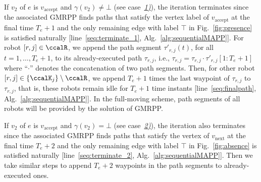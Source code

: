 \documentclass[Afour,sageh,times]{sagej}
\begin{document}
{{  If $v_2$ of $e$ is $v_{\text{accept}}$ and $\gamma(v_2) \neq \bot$ (see case~\hyperref[sec:gmmpp1]{\it 1)}), the iteration terminates since the associated GMRPP finds paths that satisfy the vertex label of $v_{\text{accept}}$ at the final time $T_e + 1$ and the only remaining edge with label $\top$ in Fig.~\ref{fig:presence} is satisfied naturally [line~\ref{seq:terminate_1}, Alg.~\ref{alg:sequentialMAPP}]. For robot $[r, j] \in \ccalR$, we append the path segment $\tau'_{r,j}(t)$, for all $t = 1, \ldots, T_e+1$, to its already-executed path $\tau_{r,j}$, i.e.,  $\tau_{r,j} = \tau_{r,j} \cdot \tau'_{r,j}[1:T_e+1]$ where ``$\cdot$'' denotes the concatenation of two path segments. Then, for other robot $[r,j] \in \{\ccalK_j\}\setminus \ccalR$, we  append  $T_e+1$ times  the last waypoint of  $\tau_{r,j}$  to $\tau_{r,j}$, that is, these robots  remain idle for $T_e+1$ time instants [line~\ref{seq:finalpath}, Alg.~\ref{alg:sequentialMAPP}]. In the full-moving scheme, path segments of all robots will be provided by the solution of GMRPP.

  If $v_2$ of $e$ is $v_{\text{accept}}$ and $\gamma(v_2) = \bot$ (see case~\hyperref[sec:gmmpp2]{\it 2)}), the iteration also terminates since the associated GMRPP finds paths that satisfy the vertex of $v_{\text{next}}$ at the final time $T_e + 2$ and the only remaining edge with label $\top$ in Fig.~\ref{fig:absence} is satisfied naturally [line~\ref{seq:terminate_2}, Alg.~\ref{alg:sequentialMAPP}]. Then we take similar steps to append $T_e+2$ waypoints in the path segments to already-executed ones.

}}
\end{document}
